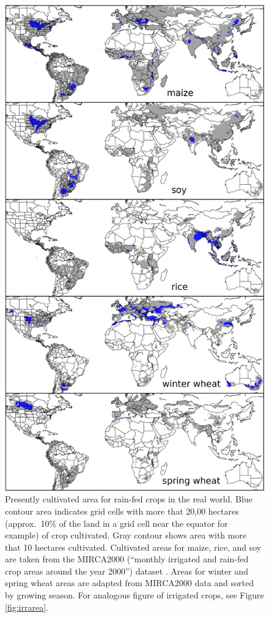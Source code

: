 \documentclass[preprint, 5p, times, twocolumn]{elsarticle}
\begin{document}
\begin{figure}[!htb]
\centering
   \includegraphics[width=0.95\linewidth]{figures/croparea.png}
   \caption{Presently cultivated area for rain-fed crops in the real world. Blue contour area indicates grid cells with more that 20,00 hectares (approx.\ 10\% of the land in a grid cell near the equator for example) of crop cultivated. Gray contour shows area with more that 10 hectares cultivated. Cultivated areas for maize, rice, and soy are taken from the MIRCA2000 (``monthly irrigated and rain-fed crop areas around the year 2000'') dataset \citep{Portmann2010}. Areas for winter and spring wheat areas are adapted from MIRCA2000 data and sorted by growing season. For analogous figure of irrigated crops, see Figure \ref{fig:irrarea}.}
   \label{fig:crop_area}
\end{figure}
\end{document}
